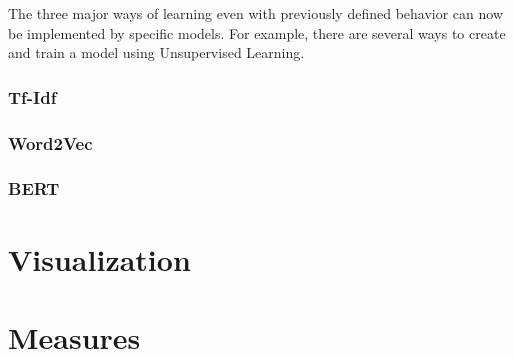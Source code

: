 The three major ways of learning even with previously defined behavior can now be implemented by specific models. For example, there are several ways to create and train a model using Unsupervised Learning.
\subsubsection{Tf-Idf}
\subsubsection{Word2Vec}
\subsubsection{BERT}

\section{Visualization}
\section{Measures}